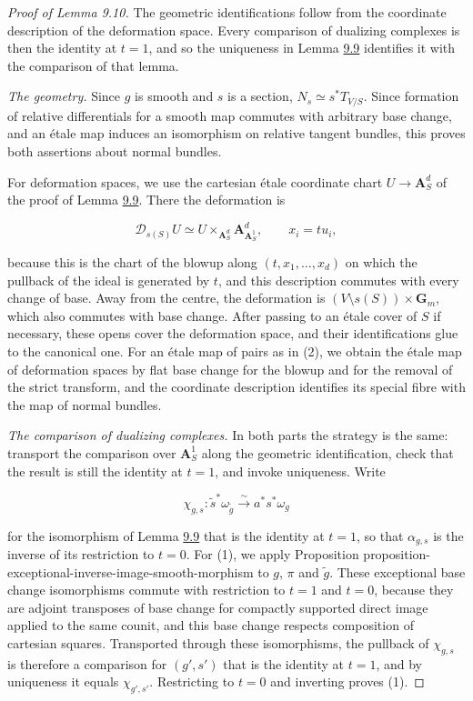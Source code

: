 \documentclass[11pt]{article}
\begin{document}
\begin{proof}[{Proof of Lemma 9.10}]\label{bp32}%
The geometric identifications follow from the coordinate description of the deformation space. Every comparison of dualizing complexes is then the identity at \(t=1\), and so the uniqueness in Lemma \hyperref[bp27]{9.9} identifies it with the comparison of that lemma.

\emph{The geometry.} Since \(g\) is smooth and \(s\) is a section, \(N_s\simeq s^*T_{V/S}\). Since formation of relative differentials for a smooth map commutes with arbitrary base change, and an étale map induces an isomorphism on relative tangent bundles, this proves both assertions about normal bundles.

For deformation spaces, we use the cartesian étale coordinate chart \(U\to\mathbf A^d_S\) of the proof of Lemma \hyperref[bp27]{9.9}. There the deformation is

\[
\mathcal D_{s(S)}U
\simeq U\times_{\mathbf A^d_S}\mathbf A^d_{\mathbf A^1_S},
\qquad x_i=t u_i,
\]

because this is the chart of the blowup along \((t,x_1,\ldots,x_d)\) on which the pullback of the ideal is generated by \(t\), and this description commutes with every change of base. Away from the centre, the deformation is \((V\setminus s(S))\times\mathbf G_m\), which also commutes with base change. After passing to an étale cover of \(S\) if necessary, these opens cover the deformation space, and their identifications glue to the canonical one. For an étale map of pairs as in (2), we obtain the étale map of deformation spaces by flat base change for the blowup and for the removal of the strict transform, and the coordinate description identifies its special fibre with the map of normal bundles.

\emph{The comparison of dualizing complexes.} In both parts the strategy is the same: transport the comparison over \(\mathbf A^1_S\) along the geometric identification, check that the result is still the identity at \(t=1\), and invoke uniqueness. Write

\[
\chi_{g,s}:\widetilde s^*\omega_{\widetilde g}\xrightarrow{\sim}a^*s^*\omega_g
\]

for the isomorphism of Lemma \hyperref[bp27]{9.9} that is the identity at \(t=1\), so that \(\alpha_{g,s}\) is the inverse of its restriction to \(t=0\). For (1), we apply Proposition proposition-exceptional-inverse-image-smooth-morphism to \(g\), \(\pi\) and \(\widetilde g\). These exceptional base change isomorphisms commute with restriction to \(t=1\) and \(t=0\), because they are adjoint transposes of base change for compactly supported direct image applied to the same counit, and this base change respects composition of cartesian squares. Transported through these isomorphisms, the pullback of \(\chi_{g,s}\) is therefore a comparison for \((g',s')\) that is the identity at \(t=1\), and by uniqueness it equals \(\chi_{g',s'}\). Restricting to \(t=0\) and inverting proves (1).


\end{proof}
\end{document}
